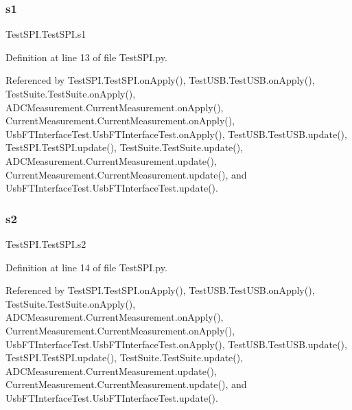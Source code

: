 \subsubsection{\texorpdfstring{s1}{s1}}
{\footnotesize\ttfamily Test\+S\+P\+I.\+Test\+S\+P\+I.\+s1}



Definition at line 13 of file Test\+S\+P\+I.\+py.



Referenced by Test\+S\+P\+I.\+Test\+S\+P\+I.\+on\+Apply(), Test\+U\+S\+B.\+Test\+U\+S\+B.\+on\+Apply(), Test\+Suite.\+Test\+Suite.\+on\+Apply(), A\+D\+C\+Measurement.\+Current\+Measurement.\+on\+Apply(), Current\+Measurement.\+Current\+Measurement.\+on\+Apply(), Usb\+F\+T\+Interface\+Test.\+Usb\+F\+T\+Interface\+Test.\+on\+Apply(), Test\+U\+S\+B.\+Test\+U\+S\+B.\+update(), Test\+S\+P\+I.\+Test\+S\+P\+I.\+update(), Test\+Suite.\+Test\+Suite.\+update(), A\+D\+C\+Measurement.\+Current\+Measurement.\+update(), Current\+Measurement.\+Current\+Measurement.\+update(), and Usb\+F\+T\+Interface\+Test.\+Usb\+F\+T\+Interface\+Test.\+update().

\mbox{\label{classTestSPI_1_1TestSPI_a9f001dfe102a7589fc88c9eb1aed91cc}} 
\subsubsection{\texorpdfstring{s2}{s2}}
{\footnotesize\ttfamily Test\+S\+P\+I.\+Test\+S\+P\+I.\+s2}



Definition at line 14 of file Test\+S\+P\+I.\+py.



Referenced by Test\+S\+P\+I.\+Test\+S\+P\+I.\+on\+Apply(), Test\+U\+S\+B.\+Test\+U\+S\+B.\+on\+Apply(), Test\+Suite.\+Test\+Suite.\+on\+Apply(), A\+D\+C\+Measurement.\+Current\+Measurement.\+on\+Apply(), Current\+Measurement.\+Current\+Measurement.\+on\+Apply(), Usb\+F\+T\+Interface\+Test.\+Usb\+F\+T\+Interface\+Test.\+on\+Apply(), Test\+U\+S\+B.\+Test\+U\+S\+B.\+update(), Test\+S\+P\+I.\+Test\+S\+P\+I.\+update(), Test\+Suite.\+Test\+Suite.\+update(), A\+D\+C\+Measurement.\+Current\+Measurement.\+update(), Current\+Measurement.\+Current\+Measurement.\+update(), and Usb\+F\+T\+Interface\+Test.\+Usb\+F\+T\+Interface\+Test.\+update().

